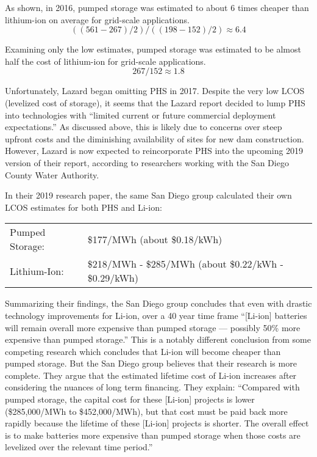 As shown, in 2016, pumped storage was estimated to about 6 times cheaper than lithium-ion on average for grid-scale applications.
\[ ((561-267)/2) / ((198-152) / 2) \approx 6.4 \]

Examining only the low estimates, pumped storage was estimated to be almost half the cost of lithium-ion for grid-scale applications.
\[ 267 / 152 \approx 1.8 \]

Unfortunately, Lazard began omitting PHS in 2017. Despite the very low LCOS (levelized cost of storage), it seems that the Lazard report decided to lump PHS into technologies with “limited current or future commercial deployment expectations.” \cite{LazardsLevelizedCostOfStorageAnalysis2018Version4} As discussed above, this is likely due to concerns over steep upfront costs and the diminishing availability of sites for new dam construction. However, Lazard is now expected to reincorporate PHS into the upcoming 2019 version of their report, according to researchers working with the San Diego County Water Authority. \cite{PumpedEnergyStorageVitalToCalifornia}

In their 2019 research paper, the same San Diego group calculated their own LCOS estimates for both PHS and Li-ion: \cite{PumpedEnergyStorageVitalToCalifornia}

\begin{tabular}{ ll }
Pumped Storage: & \$177/MWh  (about \$0.18/kWh) \\
Lithium-Ion: & \$218/MWh - \$285/MWh  (about \$0.22/kWh - \$0.29/kWh) \\
\end{tabular}

Summarizing their findings, the San Diego group concludes that even with drastic technology improvements for Li-ion, over a 40 year time frame “[Li-ion] batteries will remain overall more expensive than pumped storage — possibly 50\% more expensive than pumped storage.” \cite{PumpedEnergyStorageVitalToCalifornia} This is a notably different conclusion from some competing research which concludes that Li-ion will become cheaper than pumped storage.\cite{ProjectingTheFutureLevelizedCostOfElectricityStorageTechnologies} But the San Diego group believes that their research is more complete. They argue that the estimated lifetime cost of Li-ion increases after considering the nuances of long term financing. They explain: “Compared with pumped storage, the capital cost for these [Li-ion] projects is lower (\$285,000/MWh to \$452,000/MWh), but that cost must be paid back more rapidly because the lifetime of these [Li-ion] projects is shorter. The overall effect is to make batteries more expensive than pumped storage when those costs are levelized over the relevant time period.” \cite{PumpedEnergyStorageVitalToCalifornia}

